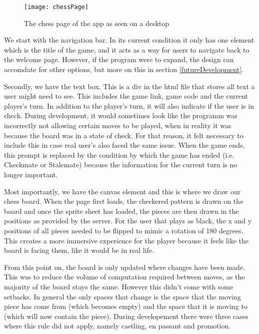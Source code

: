 \begin{figure}
    \begin{center}
        \texttt{[image: chessPage]}
        \caption{The chess page of the app as seen on a desktop}
    \end{center}
\end{figure}

We start with the navigation bar. In its current condition it only has one element which is the title of the game, and it acts as a way for users to navigate back to the welcome page. However, if the program were to expand, the design can accomdate for other options, but more on this in section \ref{futureDevelopment}.

Secondly, we have the text box. This is a div in the html file that stores all text a user might need to see. This includes the game link, game code and the current player's turn. In addition to the player's turn, it will also indicate if the user is in check. During development, it would sometimes look like the programm was incorrectly not allowing certain moves to be played, when in reality it was because the board was in a state of check. For that reason, it felt necessary to include this in case real user's also faced the same issue. When the game ends, this prompt is replaced by the condition by which the game has ended (i.e. Checkmate or Stalemate) because the information for the current turn is no longer important.

Most importantly, we have the canvas element and this is where we draw our chess board. When the page first loads, the checkered pattern is drawn on the board and once the sprite sheet \cite{SpriteSheet} has loaded, the pieces are then drawn in the positions as provided by the server. For the user that plays as black, the x and y positions of all pieces needed to be flipped to mimic a rotation of 180 degrees. This creates a more immersive experience for the player because it feels like the board is facing them, like it would be in real life.

From this point on, the board is only updated where changes have been made. This was to reduce the volume of computation required between moves, as the majority of the board stays the same. However this didn't come with some setbacks. In general the only spaces that change is the space that the moving piece has come from (which becomes empty) and the space that it is moving to (which will now contain the piece). During developement there were three cases where this rule did not apply, namely castling, en passant and promotion.

